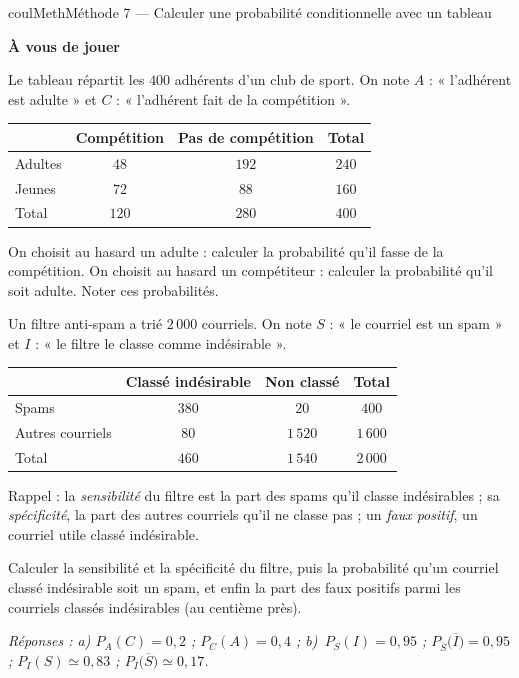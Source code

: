 \documentclass[11pt,a4paper]{article}
\makeatletter
\renewcommand{\approx}{\simeq}
\newcounter{lycee@signet}
\newcommand{\signet}[3][]{\stepcounter{lycee@signet}%
  \edef\lycee@dest{\if\relax\detokenize{#1}\relax
    signet.\arabic{lycee@signet}\else#1\fi}%
  \hypertarget{\lycee@dest}{}\bookmark[level=#2,dest=\lycee@dest]{#3}}
\newcounter{methode}
\newenvironment{methodebox}[1][Méthode]{\stepcounter{methode}%
  \begin{boitecours}[phantom={\signet[methode-\arabic{methode}]{2}{#1}}]{coulMeth}{#1}}%
  {\end{boitecours}}
\newcommand{\etape}[1]{\par\smallskip\textbf{\color{coulMeth}#1}\par\nobreak\smallskip}
\newcommand{\reponse}[1]{\par\smallskip
  {\footnotesize\itshape\color{black!55}Réponses : #1}}
\makeatother
\begin{document}
\begin{methodebox}[Méthode 7 --- Calculer une probabilité conditionnelle avec un tableau]
\etape{À vous de jouer}
\begin{questions}[label=\alph*)]
  \item Le tableau répartit les $400$ adhérents d'un club de sport. On note $A$ :
    « l'adhérent est adulte » et $C$ : « l'adhérent fait de la compétition ».
    \begin{center}
    \renewcommand{\arraystretch}{1.5}
    \begin{tabular}{|l|c|c|c|}
    \hline
     & Compétition & Pas de compétition & Total \\
    \hline
    Adultes & $48$ & $192$ & $240$ \\
    \hline
    Jeunes & $72$ & $88$ & $160$ \\
    \hline
    Total & $120$ & $280$ & $400$ \\
    \hline
    \end{tabular}
    \end{center}
    On choisit au hasard un adulte : calculer la probabilité qu'il fasse de la
    compétition. On choisit au hasard un compétiteur : calculer la probabilité qu'il
    soit adulte. Noter ces probabilités.
  \item Un filtre anti-spam a trié $2\,000$ courriels. On note $S$ : « le courriel est
    un spam » et $I$ : « le filtre le classe comme indésirable ».
    \begin{center}
    \renewcommand{\arraystretch}{1.5}
    \begin{tabular}{|l|c|c|c|}
    \hline
     & Classé indésirable & Non classé & Total \\
    \hline
    Spams & $380$ & $20$ & $400$ \\
    \hline
    Autres courriels & $80$ & $1\,520$ & $1\,600$ \\
    \hline
    Total & $460$ & $1\,540$ & $2\,000$ \\
    \hline
    \end{tabular}
    \end{center}
    Rappel : la \emph{sensibilité} du filtre est la part des spams qu'il classe
    indésirables ; sa \emph{spécificité}, la part des autres courriels qu'il ne classe
    pas ; un \emph{faux positif}, un courriel utile classé indésirable.

    Calculer la sensibilité et la spécificité du filtre, puis la probabilité qu'un
    courriel classé indésirable soit un spam, et enfin la part des faux positifs parmi
    les courriels classés indésirables (au centième près).
\end{questions}
\reponse{a) $P_A(C)=0{,}2$ ; $P_C(A)=0{,}4$ ; b)~$P_S(I)=0{,}95$ ; $P_{\overline{S}}\big(\overline{I}\big)=0{,}95$ ;
$P_I(S)\approx 0{,}83$ ;
$P_I\big(\overline{S}\big)\approx 0{,}17$.}
\end{methodebox}
\end{document}
